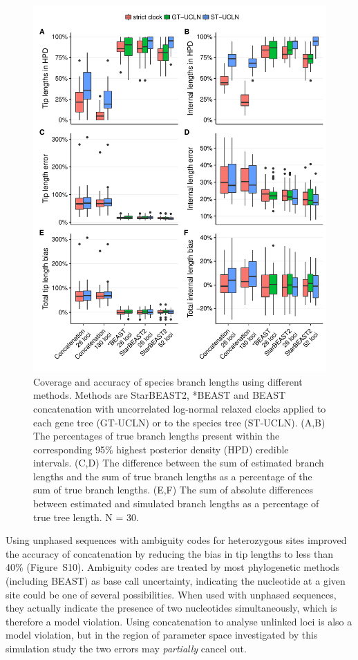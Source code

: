 \documentclass[12pt]{article}
\begin{document}
\begin{figure}[htb!]
\centering
\includegraphics[width=130mm]{branch_length_accuracy_phased.pdf}
\caption
{Coverage and accuracy of species branch lengths using different methods.
Methods are StarBEAST2, *BEAST and BEAST concatenation with uncorrelated
log-normal relaxed clocks applied to each gene tree (GT-UCLN) or to the species
tree (ST-UCLN). (A,B) The percentages of true branch lengths present within the
corresponding 95\% highest posterior density (HPD) credible intervals. (C,D)
The difference between the sum of estimated branch lengths and the sum of true
branch lengths as a percentage of the sum of true branch lengths. (E,F) The
sum of absolute differences between estimated and simulated branch lengths as
a percentage of true tree length. N = 30.}
\label{fig:branchLengthsError}
\end{figure}

Using unphased sequences with ambiguity codes for heterozygous sites improved
the accuracy of concatenation by reducing the bias in tip lengths to less than
40\% (Figure~S10). Ambiguity codes are treated by most
phylogenetic methods (including BEAST) as base call uncertainty,
indicating the nucleotide at a given site could be one of several
possibilities. When used with unphased sequences, they actually indicate the
presence of two nucleotides simultaneously, which is therefore a model violation.
Using concatenation to analyse unlinked loci is also a model violation, but in
the region of parameter space investigated by this simulation study the two
errors may \textit{partially} cancel out.
\end{document}
